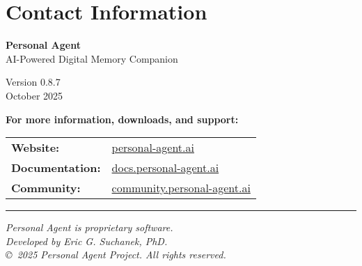 \documentclass[11pt,letterpaper]{article}
\begin{document}
\newpage
\section*{Contact Information}

\begin{center}
{\Large\bfseries\color{primaryblue} Personal Agent}\\
\vspace{0.3cm}
{\large\color{secondarygreen} AI-Powered Digital Memory Companion}\\
\vspace{1cm}

Version 0.8.7 \\ October 2025\\
\vspace{1cm}

\textbf{For more information, downloads, and support:}\\
\vspace{0.5cm}
\begin{tabular}{ll}
\textbf{Website:} & \url{personal-agent.ai} \\
\textbf{Documentation:} & \url{docs.personal-agent.ai} \\
\textbf{Community:} & \url{community.personal-agent.ai} \\
\end{tabular}

\vspace{2cm}

\hrule
\vspace{0.5cm}

\textit{Personal Agent is proprietary software.}\\
\textit{Developed by Eric G. Suchanek, PhD.}\\
\vspace{0.3cm}
\textit{\copyright\ 2025 Personal Agent Project. All rights reserved.}

\end{center}
\end{document}
